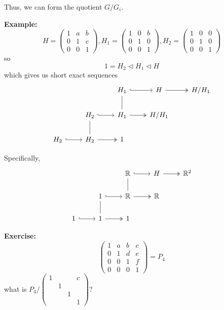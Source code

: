\documentclass[12pt]{article}
\newcommand{\R}{\mathbb{R}}
\begin{document}
    Thus, we can form the quotient $G/G_i$. 

    \textbf{Example:} 
    \[H = \begin{pmatrix}
        1 & a & b\\ 
        0 & 1 & c\\
        0 & 0 & 1
    \end{pmatrix}, H_1 = \begin{pmatrix}
        1 & 0 & b\\ 
        0 & 1 & 0\\
        0 & 0 & 1
    \end{pmatrix}, H_2 = \begin{pmatrix}
        1 & 0 & 0\\ 
        0 & 1 & 0\\
        0 & 0 & 1
    \end{pmatrix}\]
    so 
    \[1 = H_2 \triangleleft H_1 \triangleleft H\]
    which gives us short exact sequences 
    \[\begin{tikzcd}
        & & H_1 \arrow[no head]{d} \arrow[hook]{r} & H \arrow[two heads]{r} & H/H_1\\
        & H_2 \arrow[hook]{r} \arrow[no head]{d} & H_1 \arrow[two heads]{r} & H/H_1\\
        H_2 \arrow[hook]{r} & H_2 \arrow[two heads]{r} & 1
    \end{tikzcd}\]

    Specifically, 
    \[\begin{tikzcd}
        & & \R \arrow[no head]{d} \arrow[hook]{r} & H \arrow[two heads]{r} & \R^2\\
        & 1 \arrow[hook]{r} \arrow[no head]{d} & \R \arrow[two heads]{r} & \R\\
        1 \arrow[hook]{r} & 1 \arrow[two heads]{r} & 1
    \end{tikzcd}\]

    \textbf{Exercise:} 
    \[\begin{pmatrix}
        1 & a & b & c\\ 
        0 & 1 & d & e\\ 
        0 & 0 & 1 & f\\
        0 & 0 & 0 & 1
    \end{pmatrix} = P_4\] 
    what is $P_4/\begin{pmatrix}
        1 & & & c\\ 
        & 1\\ 
        & & 1\\ 
        & & & 1
    \end{pmatrix}$?
\end{document}
